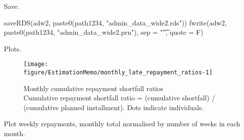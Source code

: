 Save.
\begin{Schunk}
\begin{Sinput}
saveRDS(adw2, paste0(path1234, "admin_data_wide2.rds"))
fwrite(adw2, paste0(path1234, "admin_data_wide2.prn"), sep = "\t", quote = F)
\end{Sinput}
\end{Schunk}

Plots.
\begin{Schunk}
\begin{figure}

{\centering \texttt{[image: figure/EstimationMemo/monthly\_late\_repayment\_ratios-1]} 

}

\caption{Monthly cumulative repayment shortfall ratios\\ {\footnotesize Cumulative repayment shortfall ratio = (cumulative shortfall) / (cumulative planned installment). Dots indicate individuals.}\setlength{\baselineskip}{8pt}}\label{Figure monthly late repayment ratios}
\end{figure}
\end{Schunk}




Plot weekly repayments, monthly total normalised by number of weeks in each month. 




